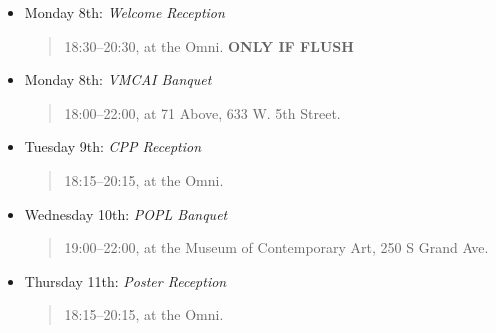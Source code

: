 
\label{Socials}

\begin{itemize}
\item Monday 8th: \textit{Welcome Reception}
      \begin{quote}
        18:30--20:30, at the Omni. \textbf{ONLY IF FLUSH}
      \end{quote}
\item Monday 8th: \textit{VMCAI Banquet}
      \begin{quote}
        18:00--22:00, at 71 Above, 633 W. 5th Street.%
      \end{quote}
\item Tuesday 9th: \textit{CPP Reception}
      \begin{quote}
        18:15--20:15, at the Omni.
      \end{quote}
\item Wednesday 10th: \textit{POPL Banquet}
      \begin{quote}
        19:00--22:00, at the Museum of Contemporary Art, 250 S Grand Ave.%
      \end{quote}
\item Thursday 11th: \textit{Poster Reception}
      \begin{quote}
        18:15--20:15, at the Omni.
      \end{quote}
\end{itemize}





\newpage
